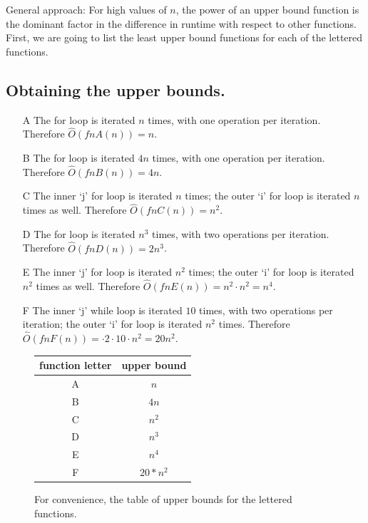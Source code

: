 \documentclass{article}
\begin{document}
    General approach: For high values of $n$, the power of an upper bound function is the dominant factor in the difference in runtime with respect to other functions. First, we are going to list
    the least upper bound functions for each of the lettered functions.
    
    \subsection{Obtaining the upper bounds.}
    \begin{enumerate}
    	\item[A] The for loop is iterated $n$ times, with one operation per iteration. Therefore $\hat O(fnA(n)) = n$.
    	\item[B] The for loop is iterated $4n$ times, with one operation per iteration. Therefore $\hat O(fnB(n)) = 4n$.
    	\item[C] The inner `j' for loop is iterated $n$ times; the outer `i' for 
    	loop is iterated $n$ times as well. Therefore $\hat O(fnC(n)) = n^2$. 
    	\item[D] The for loop is iterated $n^3$ times, with two operations per iteration. Therefore $\hat O(fnD(n)) = 2n^3$.
    	\item[E] The inner `j' for loop is iterated $n^2$ times; the outer `i' for loop is iterated $n^2$ times as well. Therefore $\hat O(fnE(n)) = n^2 \cdot n^2 = n^4$. 
    	\item[F] The inner `j' while loop is iterated $10$ times, with two operations per iteration; the outer `i' for loop is iterated $n^2$ times. Therefore $\hat O(fnF(n)) = \cdot 2 \cdot 10 \cdot n^2 = 20 n^2$.
    \end{enumerate} 
    
    
    \begin{figure}[H]
    	\centering
	    \begin{tabular}{c|c}
	    	function letter & upper bound \\
	    	\hline
	    	A & $n$ \\
	    	B & $4n$ \\
	    	C & $n^2$ \\
	    	D & $n^3$ \\
	    	E & $n^4$ \\
	    	F & $20*n^2$
	    \end{tabular}
    	\caption{For convenience, the table of upper bounds for the lettered functions. }
    \end{figure}
	
\end{document}
